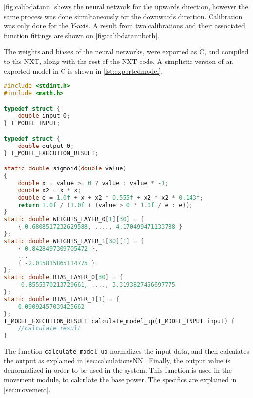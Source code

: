 
\autoref{fig:calibdatann} shows the neural network for the upwards direction, however the same process was done simultaneously for the downwards direction.
Calibration was only done for the $Y$-axis.
A result from two calibrations and their associated function fittings are shown on \autoref{fig:calibdatannboth}.


The weights and biases of the neural networks, were exported as C, and compiled to the NXT, along with the rest of the NXT code.
A simplistic version of an exported model in C is shown in \autoref{lst:exportedmodel}.


\begin{lstlisting}[language=C,label={lst:exportedmodel},firstnumber={1},caption={Autogenerated model for getting power to move up}]
#include <stdint.h>
#include <math.h>

typedef struct {
	double input_0;
} T_MODEL_INPUT;

typedef struct {
	double output_0;
} T_MODEL_EXECUTION_RESULT;

static double sigmoid(double value)
{
	double x = value >= 0 ? value : value * -1;
	double x2 = x * x;
	double e = 1.0f + x + x2 * 0.555f + x2 * x2 * 0.143f;
	return 1.0f / (1.0f + (value > 0 ? 1.0f / e : e));
}
static double WEIGHTS_LAYER_0[1][30] = {
	{ 0.6808517232629588, ...., 4.170499471133788 }
};
static double WEIGHTS_LAYER_1[30][1] = {
	{ 0.8428497309705472 },
	...
	{ -2.015815865114775 }
};
static double BIAS_LAYER_0[30] = {
	-0.8555370213729661, ...., 3.3193827456697775
};
static double BIAS_LAYER_1[1] = {
	0.09092457039425662
};
T_MODEL_EXECUTION_RESULT calculate_model_up(T_MODEL_INPUT input) {
	//calculate result
}

\end{lstlisting}
The function \texttt{calculate\_model\_up} normalizes the input data, and then calculates the output as explained in \autoref{sec:calculationsNN}.
Finally, the output value is denormalized in order to be used in the system.
This function is used in the movement module, to calculate the base power.
The specifics are explained in \autoref{sec:movement}.



